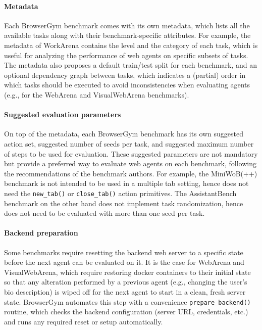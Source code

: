 \documentclass[10pt]{article} %
\begin{document}
\paragraph{Metadata} Each BrowserGym benchmark comes with its own metadata, which lists all the available tasks along with their benchmark-specific attributes. For example, the metadata of WorkArena \citep{workarena,workarena-plus-plus} contains the level and the category of each task, which is useful for analyzing the performance of web agents on specific subsets of tasks. The metadata also proposes a default train/test split for each benchmark, and an optional dependency graph between tasks, which indicates a (partial) order in which tasks should be executed to avoid inconsistencies when evaluating agents (e.g., for the WebArena \citep{webarena} and VisualWebArena \citep{visual-webarena} benchmarks).

\paragraph{Suggested evaluation parameters} On top of the metadata, each BrowserGym benchmark has its own suggested action set, suggested number of seeds per task, and suggested maximum number of steps to be used for evaluation. These suggested parameters are not mandatory but provide a preferred way to evaluate web agents on each benchmark, following the recommendations of the benchmark authors. For example, the MiniWoB(++) benchmark \citep{world-of-bits,Miniwob_plusplus} is not intended to be used in a multiple tab setting, hence does not need the \texttt{new\_tab()} or \texttt{close\_tab()} action primitives. The AssistantBench benchmark \citep{assistant-bench} on the other hand does not implement task randomization, hence does not need to be evaluated with more than one seed per task.

\paragraph{Backend preparation} Some benchmarks require resetting the backend web server to a specific state before the next agent can be evaluated on it. It is the case for WebArena and VisualWebArena, which require restoring docker containers to their initial state so that any alteration performed by a previous agent (e.g., changing the user's bio description) is wiped off for the next agent to start in a clean, fresh server state. BrowserGym automates this step with a convenience \texttt{prepare\_backend()} routine, which checks the backend configuration (server URL, credentials, etc.) and runs any required reset or setup automatically.
\end{document}
